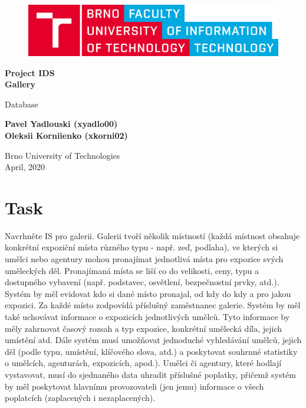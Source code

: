 \documentclass[12pt,a4paper]{article}
\begin{document}

\begin{titlepage}
   \begin{center}
        \vspace*{1cm}
        \begin{figure}[h!]
            \centering
            \includegraphics[width=\textwidth,height=\textheight,keepaspectratio]
            {VUT-FIT-logo-en.png}
        \end{figure}    

        \vspace{0.8cm}
        \large{

        \textbf{Project IDS\\Gallery}

        \vspace{0.5cm}
            Database
        \vspace{1.5cm}

        \textbf{Pavel Yadlouski (xyadlo00)\\Oleksii Korniienko (xkorni02)}

        \vfill
                

        Brno University of Technologies\\
        April, 2020
        }
   \end{center}
\end{titlepage}

\section{Task}

Navrhněte IS pro galerii. Galerii tvoří několik místností (každá místnost 
obsahuje konkrétní expoziční místa různého typu - např. zeď, podlaha), ve kterých
si umělci nebo agentury mohou pronajímat jednotlivá místa pro expozice svých 
uměleckých děl. Pronajímaná místa se liší co do velikosti, ceny, typu a 
dostupného vybavení (např. podstavec, osvětlení, bezpečnostní prvky, atd.). 
Systém by měl evidovat kdo si dané místo pronajal, od kdy do kdy a pro jakou 
expozici. Za každé místo zodpovídá příslušný zaměstnanec galerie. Systém by měl 
také uchovávat informace o expozicích jednotlivých umělců. Tyto informace by měly 
zahrnovat časový rozsah a typ expozice, konkrétní umělecká díla, jejich 
umístění atd. Dále systém musí umožňovat jednoduché vyhledávání umělců, jejich 
děl (podle typu, umístění, klíčového slova, atd.) a poskytovat souhrnné 
statistiky o umělcích, agenturách, expozicích, apod.). Umělci či agentury, 
které hodlají vystavovat, musí do sjednaného data uhradit příslušné poplatky, 
přičemž systém by měl poskytovat hlavnímu provozovateli (jen jemu) informace o 
všech poplatcích (zaplacených i nezaplacených).
\end{document}
